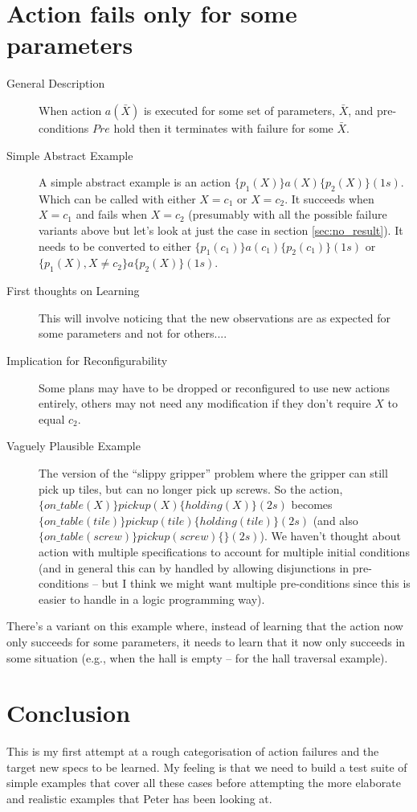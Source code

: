 \documentclass{blue-book}
\newcommand{\actionspec}[4]{\ensuremath{\{#1\}#2\{#3\}(#4)}}
\begin{document}
\section{Action fails only for some parameters}
\begin{description}
\item[General Description] When action $a(\bar{X})$ is executed for some set of parameters, $\bar{X}$, and pre-conditions $Pre$ hold then it terminates with failure for some $\bar{X}$.

\item[Simple Abstract Example] A simple abstract example is an action \actionspec{p_1(X)}{a(X)}{p_2(X)}{1s}.  Which can be called with either $X=c_1$ or $X=c_2$.  It succeeds when $X = c_1$ and fails when $X=c_2$ (presumably with all the possible failure variants above but let's look at just the case in section \ref{sec:no_result}).  It needs to be converted to either \actionspec{p_1(c_1)}{a(c_1)}{p_2(c_1)}{1s} or \actionspec{p_1(X), X \neq c_2}{a}{p_2(X)}{1s}.  

\item[First thoughts on Learning]  This will involve noticing that the new observations are as expected for some parameters and not for others....

\item[Implication for Reconfigurability]  Some plans may have to be dropped or reconfigured to use new actions entirely, others may not need any modification if they don't require $X$ to equal $c_2$.

\item[Vaguely Plausible Example] The version of the ``slippy gripper'' problem where the gripper can still pick up tiles, but can no longer pick up screws.  So the action, \actionspec{on\_table(X)}{pickup(X)}{holding(X)}{2s} becomes \actionspec{on\_table(tile)}{pickup(tile)}{holding(tile)}{2s} (and also \actionspec{on\_table(screw)}{pickup(screw)}{}{2s}).  We haven't thought about action with multiple specifications to account for multiple initial conditions (and in general this can by handled by allowing disjunctions in pre-conditions -- but I think we might want multiple pre-conditions since this is easier to handle in a logic programming way).
\end{description}

There's a variant on this example where,  instead of learning that the action now only succeeds for some parameters, it needs to learn that it now only succeeds in some situation (e.g., when the hall is empty -- for the hall traversal example).

\section{Conclusion}
This is my first attempt at a rough categorisation of action failures and the target new specs to be learned.  My feeling is that we need to build a test suite of simple examples that cover all these cases before attempting the more elaborate and realistic examples that Peter has been looking at.
\end{document}
